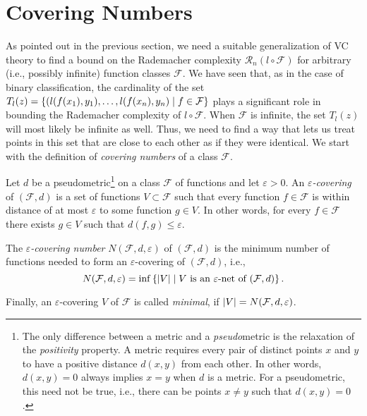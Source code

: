 \section{Covering Numbers}

As pointed out in the previous section, we need a suitable generalization of VC theory to find a bound on the Rademacher complexity $\mathcal{R}_n(l \circ \mathcal{F})$ for arbitrary (i.e., possibly infinite) function classes $\mathcal{F}$. We have seen that, as in the case of binary classification, the cardinality of the set $T_l(z) = \left\{(l(f(x_1), y_1), \dots, l(f(x_n), y_n) \mathrel{|} f \in \mathcal{F}\right\}$ plays a significant role in bounding the Rademacher complexity of $l \circ \mathcal{F}$. When $\mathcal{F}$ is infinite, the set $T_l(z)$ will  most likely be infinite as well. Thus, we need to find a way that lets us treat points in this set that are close to each other as if they were identical. We start with the definition of \emph{covering numbers} of a class $\mathcal{F}$.

\begin{definition}
Let $d$ be a pseudometric\footnote{The only difference between a metric and a \emph{pseudo}metric is the relaxation of the \emph{positivity} property. A metric requires every pair of distinct points $x$ and $y$ to have a positive distance $d(x, y)$ from each other. In other words, $d(x, y) = 0$ always implies $x = y$ when $d$ is a metric. For a pseudometric, this need not be true, i.e., there can be points $x \neq y$ such that $d(x, y) = 0$.} on a class $\mathcal{F}$ of functions and let $\varepsilon > 0$. An \emph{$\varepsilon$-covering} of $(\mathcal{F}, d)$ is a set of functions $V \subset \mathcal{F}$ such that every function $f \in \mathcal{F}$ is within distance of at most $\varepsilon$ to some function $g \in V$. In other words, for every $f \in \mathcal{F}$ there exists $g \in V$ such that $d(f, g) \leq \varepsilon$.

The \emph{$\varepsilon$-covering number} $N(\mathcal{F}, d, \varepsilon)$ of $(\mathcal{F}, d)$ is the minimum number of functions needed to form an $\varepsilon$-covering of $(\mathcal{F}, d)$, i.e.,
\[
    N(\mathcal{F}, d, \varepsilon) = \inf\left\{\abs{V} \mathrel{|} V \text{ is an } \varepsilon \text{-net of } (\mathcal{F}, d)\right\}.
\]

Finally, an $\varepsilon$-covering $V$ of $\mathcal{F}$ is called \emph{minimal}, if $\abs{V} = N(\mathcal{F}, d, \varepsilon)$.
\end{definition}

